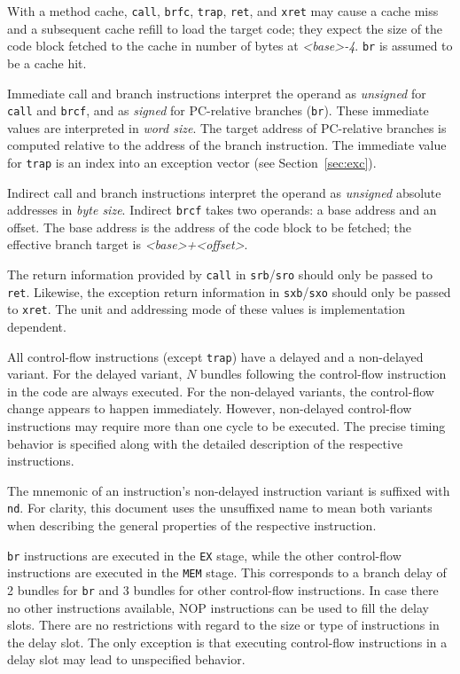 \documentclass[a4paper,fontsize=10pt,twoside,DIV15,BCOR12mm,headinclude=true,footinclude=false,pagesize,bibtotoc]{scrbook}
\newcommand{\comment}[3]{

\textsf{\textbf{#1}} {\color{#3}#2}}
\newcommand{\wolf}[1]{\comment{Wolfgang}{#1}{OliveGreen}}
\renewcommand{\wolf}[1]{}
\begin{document}
With a method cache, \texttt{call}, \texttt{brfc}, \texttt{trap},
\texttt{ret}, and \texttt{xret} may cause a cache miss and a
subsequent cache refill to load the target code; they expect the size
of the code block fetched to the cache in number of bytes at
\textit{<base>-4}. \texttt{br} is assumed to be a cache hit.

Immediate call and branch instructions interpret the operand as
\emph{unsigned} for \texttt{call} and \texttt{brcf}, and as
\emph{signed} for PC-relative branches (\texttt{br}). These immediate
values are interpreted in \emph{word size}. The target address of
PC-relative branches is computed relative to the address of the branch
instruction. The immediate value for \texttt{trap} is an index into an
exception vector (see Section~\ref{sec:exc}).

Indirect call and branch instructions interpret the operand as
\emph{unsigned} absolute addresses in \emph{byte size}. Indirect
\texttt{brcf} takes two operands: a base address and an offset. The
base address is the address of the code block to be fetched; the
effective branch target is \textit{<base>+<offset>}.

The return information provided by \texttt{call} in
\texttt{srb}/\texttt{sro} should only be passed to
\texttt{ret}. Likewise, the exception return information in
\texttt{sxb}/\texttt{sxo} should only be passed to \texttt{xret}. The
unit and addressing mode of these values is implementation
dependent.\wolf{Should we keep it implementation dependent, or should
  we enforce way it is in the current implementation?}

All control-flow instructions (except \texttt{trap}) have a delayed
and a non-delayed variant. For the delayed variant, $N$
bundles following the control-flow instruction in the code are always
executed. For the non-delayed variants, the control-flow change
appears to happen immediately. However, non-delayed control-flow
instructions may require more than one cycle to be executed. The
precise timing behavior is specified along with the detailed
description of the respective instructions.

The mnemonic of an instruction's non-delayed instruction variant is
suffixed with \texttt{nd}. For clarity, this document uses the
unsuffixed name to mean both variants when describing the general
properties of the respective instruction.

\texttt{br} instructions are executed in the \texttt{EX} stage, while
the other control-flow instructions are executed in the \texttt{MEM}
stage. This corresponds to a branch delay of 2 bundles for \texttt{br}
and 3 bundles for other control-flow instructions. In case there no
other instructions available, NOP instructions can be used to fill the
delay slots. There are no restrictions with regard to the size or type
of instructions in the delay slot. The only exception is that
executing control-flow instructions in a delay slot may lead to
unspecified behavior.
\end{document}
